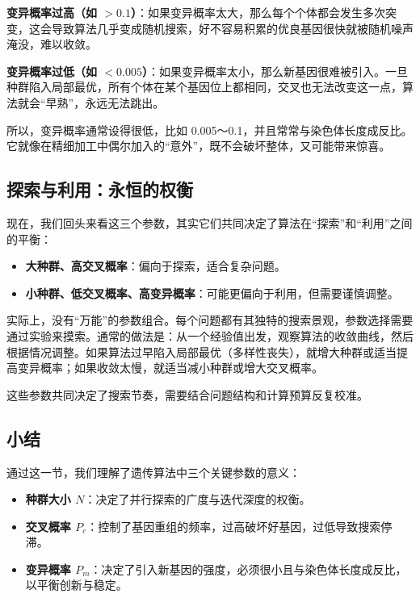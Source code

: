 \documentclass[lang=cn,zihao=-4,a4paper,fontset=windows]{beautybook}
\begin{document}
\textbf{变异概率过高（如 $>0.1$）}：如果变异概率太大，那么每个个体都会发生多次突变，这会导致算法几乎变成随机搜索，好不容易积累的优良基因很快就被随机噪声淹没，难以收敛。

\textbf{变异概率过低（如 $<0.005$）}：如果变异概率太小，那么新基因很难被引入。一旦种群陷入局部最优，所有个体在某个基因位上都相同，交叉也无法改变这一点，算法就会“早熟”，永远无法跳出。

所以，变异概率通常设得很低，比如 0.005～0.1，并且常常与染色体长度成反比。它就像在精细加工中偶尔加入的“意外”，既不会破坏整体，又可能带来惊喜。

\subsection{探索与利用：永恒的权衡}

现在，我们回头来看这三个参数，其实它们共同决定了算法在“探索”和“利用”之间的平衡：

\begin{itemize}
    \item \textbf{大种群、高交叉概率}：偏向于探索，适合复杂问题。
    \item \textbf{小种群、低交叉概率、高变异概率}：可能更偏向于利用，但需要谨慎调整。
\end{itemize}

实际上，没有“万能”的参数组合。每个问题都有其独特的搜索景观，参数选择需要通过实验来摸索。通常的做法是：从一个经验值出发，观察算法的收敛曲线，然后根据情况调整。如果算法过早陷入局部最优（多样性丧失），就增大种群或适当提高变异概率；如果收敛太慢，就适当减小种群或增大交叉概率。

这些参数共同决定了搜索节奏，需要结合问题结构和计算预算反复校准。

\subsection{小结}

通过这一节，我们理解了遗传算法中三个关键参数的意义：

\begin{itemize}
    \item \textbf{种群大小 $N$}：决定了并行探索的广度与迭代深度的权衡。
    \item \textbf{交叉概率 $P_c$}：控制了基因重组的频率，过高破坏好基因，过低导致搜索停滞。
    \item \textbf{变异概率 $P_m$}：决定了引入新基因的强度，必须很小且与染色体长度成反比，以平衡创新与稳定。
\end{itemize}
\end{document}
